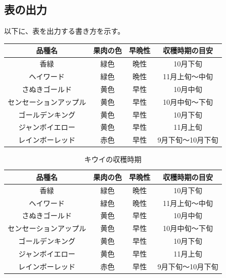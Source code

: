 \newpage

\subsection{表の出力}

以下に、表を出力する書き方を示す。

\begin{table}[H] %
    \begin{tabular}{cccc}
    \hline
    品種名         & 果肉の色 & 早晩性 & 収穫時期の目安    \\ \hline
    香緑          & 緑色   & 晩性  & 10月下旬      \\
    ヘイワード       & 緑色   & 晩性  & 11月上旬～中旬   \\
    さぬきゴールド     & 黄色   & 早性  & 10月中旬      \\
    センセーションアップル & 黄色   & 早性  & 10月中旬～下旬   \\
    ゴールデンキング    & 黄色   & 早性  & 10月下旬      \\
    ジャンボイエロー    & 黄色   & 早性  & 11月上旬      \\
    レインボーレッド    & 赤色   & 早性  & 9月下旬～10月下旬 \\ \hline
    \end{tabular}
\end{table}

\begin{table}[H]
    \caption{キウイの収穫時期}\label{tab:zikikiui}
	\vspace{-5mm}
	\begin{center}
        \begin{tabular}{cccc}
        \hline
        品種名         & 果肉の色 & 早晩性 & 収穫時期の目安    \\ \hline
        香緑          & 緑色   & 晩性  & 10月下旬      \\
        ヘイワード       & 緑色   & 晩性  & 11月上旬～中旬   \\
        さぬきゴールド     & 黄色   & 早性  & 10月中旬      \\
        センセーションアップル & 黄色   & 早性  & 10月中旬～下旬   \\
        ゴールデンキング    & 黄色   & 早性  & 10月下旬      \\
        ジャンボイエロー    & 黄色   & 早性  & 11月上旬      \\
        レインボーレッド    & 赤色   & 早性  & 9月下旬～10月下旬 \\ \hline
        \end{tabular}
    \end{center}
\end{table}

